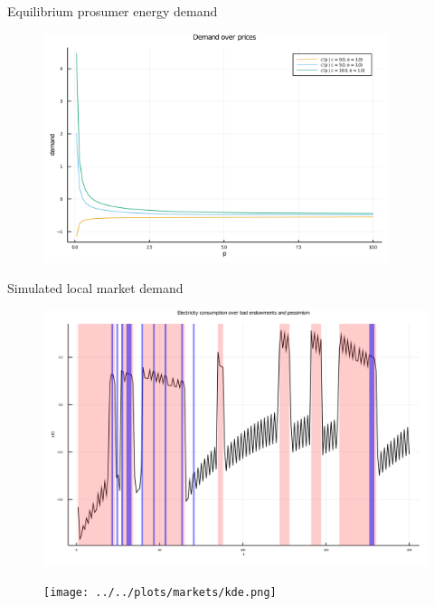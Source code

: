 \documentclass[xcolor={svgnames}]{beamer}
\begin{document}
\begin{frame}{Equilibrium prosumer energy demand}
    \begin{figure}
        \centering
        \includegraphics[width=0.9\textwidth]{../../plots/markets/pricedemand.png}
    \end{figure}
\end{frame}

\begin{frame}{Simulated local market demand}

    \begin{figure}
        \centering
        \begin{minipage}{.5\textwidth}
            \centering
            \includegraphics[width=\linewidth]{../../plots/markets/simul.png}
        \end{minipage}%
        \begin{minipage}{.5\textwidth}
            \centering
            \texttt{[image: ../../plots/markets/kde.png]}
        \end{minipage}
    \end{figure}

\end{frame}
\end{document}
